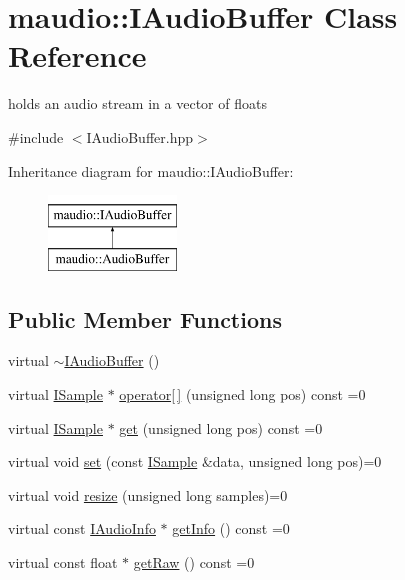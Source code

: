 \hypertarget{classmaudio_1_1IAudioBuffer}{\section{maudio\-:\-:I\-Audio\-Buffer Class Reference}
\label{classmaudio_1_1IAudioBuffer}
}


holds an audio stream in a vector of floats  




{\ttfamily \#include $<$I\-Audio\-Buffer.\-hpp$>$}

Inheritance diagram for maudio\-:\-:I\-Audio\-Buffer\-:\begin{figure}[H]
\begin{center}
\leavevmode
\includegraphics[height=2.000000cm]{classmaudio_1_1IAudioBuffer}
\end{center}
\end{figure}
\subsection*{Public Member Functions}
\begin{DoxyCompactItemize}
\item 
virtual \hyperlink{classmaudio_1_1IAudioBuffer_aaec85fcb95eec6f7cf3913300131015c}{$\sim$\-I\-Audio\-Buffer} ()
\item 
virtual \hyperlink{classmaudio_1_1ISample}{I\-Sample} $\ast$ \hyperlink{classmaudio_1_1IAudioBuffer_a32a5742929553887a22e4d48be0e3763}{operator\mbox{[}$\,$\mbox{]}} (unsigned long pos) const =0
\item 
virtual \hyperlink{classmaudio_1_1ISample}{I\-Sample} $\ast$ \hyperlink{classmaudio_1_1IAudioBuffer_aaea60a9702071ae0b12e9e616e72defb}{get} (unsigned long pos) const =0
\item 
virtual void \hyperlink{classmaudio_1_1IAudioBuffer_ab8f8728745907781bc31508d5816ef60}{set} (const \hyperlink{classmaudio_1_1ISample}{I\-Sample} \&data, unsigned long pos)=0
\item 
virtual void \hyperlink{classmaudio_1_1IAudioBuffer_a50d44964ef18c7dfd483fd0e68294d6b}{resize} (unsigned long samples)=0
\item 
virtual const \hyperlink{classmaudio_1_1IAudioInfo}{I\-Audio\-Info} $\ast$ \hyperlink{classmaudio_1_1IAudioBuffer_afd0eb3d169bade19e4508a4eaa2a07b4}{get\-Info} () const =0
\item 
virtual const float $\ast$ \hyperlink{classmaudio_1_1IAudioBuffer_a60f486dc3d94b4c4f06df698e7848117}{get\-Raw} () const =0
\end{DoxyCompactItemize}


